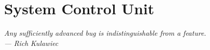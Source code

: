\chapter{System Control Unit}\label{ch:avr}

\begin{flushright}{\slshape
    Any sufficiently advanced bug is indistinguishable from a feature.\\ \medskip
    --- Rich Kulawiec}
\end{flushright}









